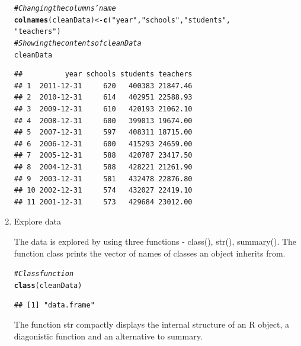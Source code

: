 \documentclass{article}\usepackage[]{graphicx}\usepackage[]{color}
\makeatletter
\newcommand{\hlstr}[1]{\textcolor[rgb]{0.192,0.494,0.8}{#1}}%
\newcommand{\hlcom}[1]{\textcolor[rgb]{0.678,0.584,0.686}{\textit{#1}}}%
\newcommand{\hlstd}[1]{\textcolor[rgb]{0.345,0.345,0.345}{#1}}%
\newcommand{\hlkwb}[1]{\textcolor[rgb]{0.69,0.353,0.396}{#1}}%
\newcommand{\hlkwd}[1]{\textcolor[rgb]{0.737,0.353,0.396}{\textbf{#1}}}%
\newenvironment{kframe}{%
 \def\at@end@of@kframe{}%
 \ifinner\ifhmode%
  \def\at@end@of@kframe{\end{minipage}}%
  \begin{minipage}{\columnwidth}%
 \fi\fi%
 \def\FrameCommand##1{\hskip\@totalleftmargin \hskip-\fboxsep
 \colorbox{shadecolor}{##1}\hskip-\fboxsep
     \hskip-\linewidth \hskip-\@totalleftmargin \hskip\columnwidth}%
 \MakeFramed {\advance\hsize-\width
   \@totalleftmargin\z@ \linewidth\hsize
   \@setminipage}}%
 {\par\unskip\endMakeFramed%
 \at@end@of@kframe}
\newenvironment{knitrout}{}{} %
\makeatother
\begin{document}
\begin{enumerate}
\begin{knitrout}
\color{fgcolor}\begin{kframe}
\begin{alltt}
\hlcom{# Changing the columns' name}
\hlkwd{colnames}\hlstd{(cleanData)} \hlkwb{<-} \hlkwd{c}\hlstd{(}\hlstr{"year"}\hlstd{,} \hlstr{"schools"}\hlstd{,} \hlstr{"students"}\hlstd{,}
                         \hlstr{"teachers"}\hlstd{)}
\hlcom{# Showing the contents of cleanData}
\hlstd{cleanData}
\end{alltt}
\begin{verbatim}
##          year schools students teachers
## 1  2011-12-31     620   400383 21847.46
## 2  2010-12-31     614   402951 22588.93
## 3  2009-12-31     610   420193 21062.10
## 4  2008-12-31     600   399013 19674.00
## 5  2007-12-31     597   408311 18715.00
## 6  2006-12-31     600   415293 24659.00
## 7  2005-12-31     588   420787 23417.50
## 8  2004-12-31     588   428221 21261.90
## 9  2003-12-31     581   432478 22876.80
## 10 2002-12-31     574   432027 22419.10
## 11 2001-12-31     573   429684 23012.00
\end{verbatim}
\end{kframe}
\end{knitrout}
\item Explore data

The data is explored by using three functions - class(), str(), summary().
The function class prints the vector of names of classes an object inherits from.

\begin{knitrout}
\color{fgcolor}\begin{kframe}
\begin{alltt}
\hlcom{# Class function}
\hlkwd{class}\hlstd{(cleanData)}
\end{alltt}
\begin{verbatim}
## [1] "data.frame"
\end{verbatim}
\end{kframe}
\end{knitrout}
The function str compactly displays the internal structure of an R object, a diagonistic function and an   alternative to summary.


\end{enumerate}
\end{document}
